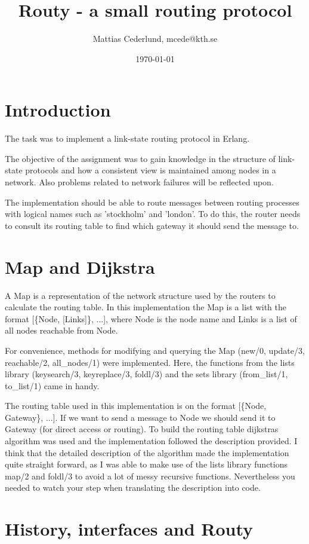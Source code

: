 \documentclass[a4paper, 11pt]{article}
\title{Routy - a small routing protocol}
\author{Mattias Cederlund, mcede@kth.se}
\date{\today{}}
\begin{document}
\maketitle

\section{Introduction}

The task was to implement a link-state routing protocol in Erlang.

The objective of the assignment was to gain knowledge in the structure of link-state protocols and how a consistent view is maintained among nodes in a network. Also problems related to network failures will be reflected upon.

The implementation should be able to route messages between routing processes with logical names such as 'stockholm' and 'london'. To do this, the router needs to consult its routing table to find which gateway it should send the message to.

\section{Map and Dijkstra}

A Map is a representation of the network structure used by the routers to calculate the routing table. In this implementation the Map is a list with the format [\{Node, [Links]\}, ...], where Node is the node name and Links is a list of all nodes reachable from Node. 

For convenience, methods for modifying and querying the Map (new/0, update/3, reachable/2, all\_nodes/1) were implemented. Here, the functions from the lists library (keysearch/3, keyreplace/3, foldl/3) and the sets library (from\_list/1, to\_list/1) came in handy.

The routing table used in this implementation is on the format [\{Node, Gateway\}, ...]. If we want to send a message to Node we should send it to Gateway (for direct access or routing). To build the routing table dijkstras algorithm was used and the implementation followed the description provided. I think that the detailed description of the algorithm made the implementation quite straight forward, as I was able to make use of the lists library functions map/2 and foldl/3 to avoid a lot of messy recursive functions. Nevertheless you needed to watch your step when translating the description into code.

\section{History, interfaces and Routy}
\end{document}

